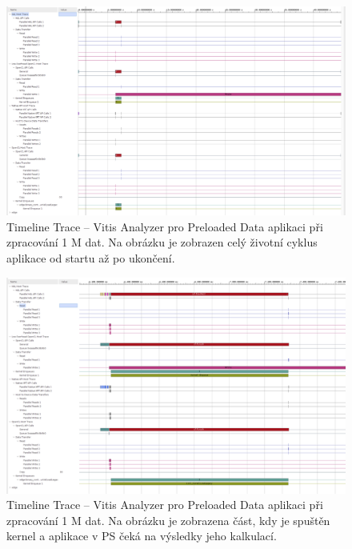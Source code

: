 \documentclass[a4paper, twoside, 11pt]{article}
\begin{document}
	\begin{figure}[htbp!]
		\centering
		\includegraphics[width=1\textwidth]{src/png/vitis-analyzer/legacy-rt/1M-data/writing-data-output/legacy-rt-step-0.000001-timeline-trace-zoom-out.png}
		\caption{Timeline Trace – Vitis Analyzer pro Preloaded Data aplikaci při zpracování 1 M dat. Na obrázku je zobrazen celý životní cyklus aplikace od startu až po ukončení.}
		\label{fig:legacy-rt-step-0.000001-timeline-trace-zoom-out}
	\end{figure}

	\begin{figure}[htbp!]
		\centering
		\includegraphics[width=1\textwidth]{src/png/vitis-analyzer/legacy-rt/1M-data/writing-data-output/legacy-rt-step-0.000001-timeline-trace-execution.png}
		\caption{Timeline Trace – Vitis Analyzer pro Preloaded Data aplikaci při zpracování 1 M dat. Na obrázku je zobrazena část, kdy je spuštěn kernel a aplikace v PS čeká na výsledky jeho kalkulací.}
		\label{fig:legacy-rt-step-0.000001-timeline-trace-execution}
	\end{figure}
\end{document}

